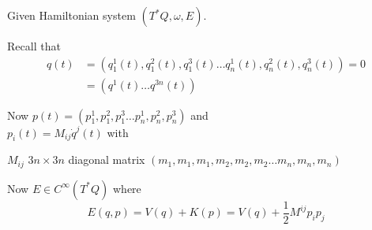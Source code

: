  Given Hamiltonian system $(T^*Q, \omega,E)$.  

Recall that 
\[
\begin{aligned}
  q(t) & = (q_1^1(t),q_1^2(t), q_1^3(t) \dots q^1_n(t),q_n^2(t),q_n^3(t))=0 \\
  & = (q^1(t) \dots q^{3n}(t))
\end{aligned}
\]

Now $p(t) = (p_1^1,p_1^2,p_1^3\dots p_n^1,p_n^2,p_n^3)$ and \\
$p_i(t)=M_{ij}\dot{q}^j(t)$ with 

$M_{ij}$ $3n \times 3n$ diagonal matrix $(m_1,m_1,m_1,m_2,m_2,m_2 \dots m_n, m_n, m_n)$

Now $E \in C^{\infty}(T^*Q)$ where 
\[
E(q,p) = V(q) + K(p) = V(q) + \frac{1}{2} M^{ij}p_i p_j
\]

